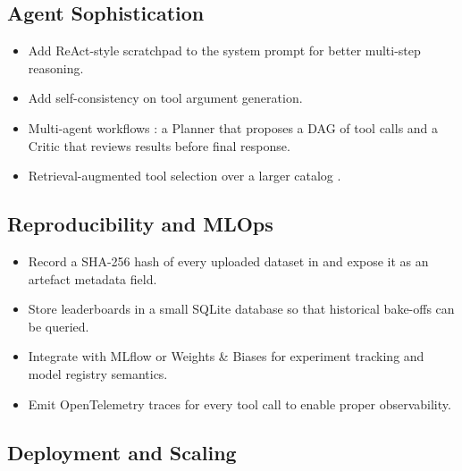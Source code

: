 \subsection{Agent Sophistication}
\label{sec:future-agent}

\begin{itemize}[leftmargin=1.4em]
  \item \propd{} Add ReAct-style scratchpad
        \citep{yao2023react} to the system prompt for better
        multi-step reasoning.
  \item \propd{} Add self-consistency
        \citep{wang2023self-consistency} on tool argument
        generation.
  \item \future{} Multi-agent workflows
        \citep{wu2023autogen, hong2024metagpt}: a Planner that
        proposes a DAG of tool calls and a Critic that reviews
        results before final response.
  \item \future{} Retrieval-augmented tool selection over a larger
        catalog \citep{patil2023gorilla, qin2024toolllm}.
\end{itemize}

\subsection{Reproducibility and MLOps}
\label{sec:future-mlops}

\begin{itemize}[leftmargin=1.4em]
  \item \propd{} Record a SHA-256 hash of every uploaded dataset in
         and expose it as an artefact metadata
        field.
  \item \propd{} Store leaderboards in a small SQLite database so
        that historical bake-offs can be queried.
  \item \future{} Integrate with MLflow \citep{mlflow} or Weights
        \& Biases \citep{wandb} for experiment tracking and model
        registry semantics.
  \item \future{} Emit OpenTelemetry \citep{opentelemetry} traces
        for every tool call to enable proper observability.
\end{itemize}

\subsection{Deployment and Scaling}
\label{sec:future-deploy}

